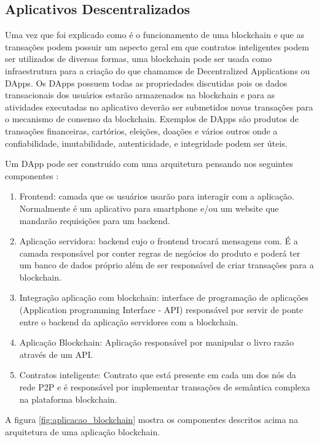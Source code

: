 \documentclass[12pt]{article}
\begin{document}
\subsection{Aplicativos Descentralizados}

Uma vez que foi explicado como é o funcionamento de uma blockchain e que as transações podem possuir um aspecto geral em que contratos inteligentes podem ser utilizados de diversas formas, uma blockchain pode ser usada como infraestrutura para a criação do que chamamos de Decentralized Applications ou DApps. Os DApps possuem todas as propriedades discutidas pois os dados transacionais dos usuários estarão armazenados na blockchain e para as atividades executadas no aplicativo deverão ser submetidos novas transações para o mecanismo de consenso da blockchain. Exemplos de DApps são produtos de transações financeiras, cartórios, eleições, doações e vários outros onde a confiabilidade, imutabilidade, autenticidade, e integridade podem ser úteis.

Um DApp pode ser construído com uma arquitetura pensando nos seguintes componentes \cite{braga2017segurancca}:

\begin{enumerate}
    \item Frontend: camada que os usuários usarão para interagir com a aplicação. Normalmente é um aplicativo para smartphone e/ou um website que mandarão requisições para um backend.
    \item Aplicação servidora: backend cujo o frontend trocará mensagens com. É a camada responsável por conter regras de negócios do produto e poderá ter um banco de dados próprio além de ser responsável de criar transações para a blockchain.
    \item Integração aplicação com blockchain: interface de programação de aplicações (Application programming
Interface - API) responsável por servir de ponte entre o backend da aplicação servidores com a blockchain.
    \item Aplicação Blockchain: Aplicação responsável por manipular o livro razão através de um API.
    \item Contratos inteligente: Contrato que está presente em cada um dos nós da rede P2P e é responsável por implementar transações de semântica complexa na plataforma blockchain. 
\end{enumerate}

A figura \ref{fig:aplicacao_blockchain} mostra os componentes descritos acima na arquitetura de uma aplicação blockchain.
\end{document}
